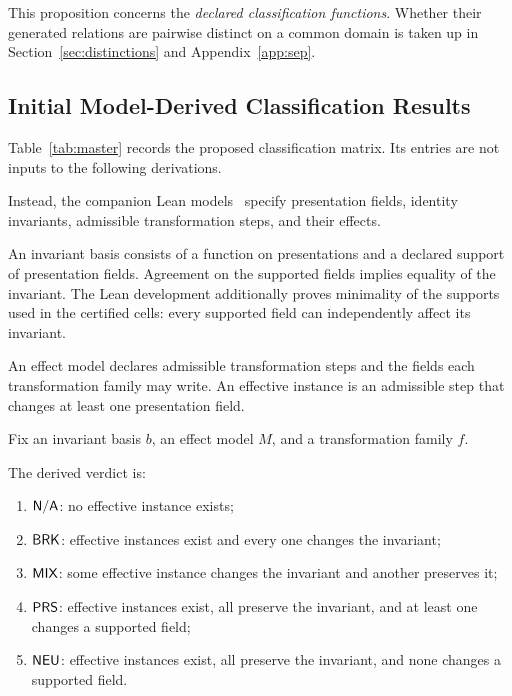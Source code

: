 This proposition concerns the \emph{declared classification functions}.
Whether their generated relations are pairwise distinct on a common
domain is taken up in Section~\ref{sec:distinctions} and
Appendix~\ref{app:sep}.

\subsection{Initial Model-Derived Classification Results}
\label{subsec:model_derived_results}

Table~\ref{tab:master} records the proposed classification matrix.
Its entries are not inputs to the following derivations.

Instead, the companion Lean models~\citep{case2026identityregimes}
specify presentation fields, identity invariants,
admissible transformation steps, and their effects.

An invariant basis consists of a function on presentations
and a declared support of presentation fields.
Agreement on the supported fields implies equality of the invariant.
The Lean development additionally proves minimality of the
supports used in the certified cells: every supported field
can independently affect its invariant.

An effect model declares admissible transformation steps and
the fields each transformation family may write.
An effective instance is an admissible step that changes
at least one presentation field.

\begin{definition}
  \label{se200.def.ModelDerivedVerdict}
  Fix an invariant basis $b$, an effect model $M$, and a
  transformation family $f$.

  The derived verdict is:
  \begin{enumerate}[label=(\alph*),nosep]
    \item $\textsf{N/A}$: no effective instance exists;
    \item $\textsf{BRK}$: effective instances exist and every one
          changes the invariant;
    \item $\textsf{MIX}$: some effective instance changes the invariant
          and another preserves it;
    \item $\textsf{PRS}$: effective instances exist, all preserve the
          invariant, and at least one changes a supported field;
    \item $\textsf{NEU}$: effective instances exist, all preserve the
          invariant, and none changes a supported field.
  \end{enumerate}
\end{definition}

